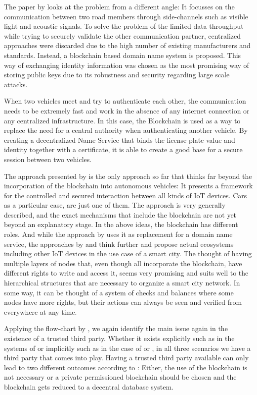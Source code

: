 The paper by \citeauthor{Rowan2017} looks at the problem from a different angle: It focusses on the communication between two road members through side-channels such as visible light and acoustic signals. To solve the problem of the limited data throughput while trying to securely validate the other communication partner, centralized approaches were discarded due to the high number of existing manufacturers and standards. Instead, a blockchain based domain name system is proposed. This way of exchanging identity information was chosen as the most promising way of storing public keys due to its robustness and security regarding large scale attacks.

When two vehicles meet and try to authenticate each other, the communication  needs to be extremely fast and work in the absence of any internet connection or any centralized infrastructure. 
In this case, the Blockchain is used as a way to replace the need for a central authority when authenticating another vehicle. By creating a decentralized Name Service that binds the license plate value and identity together with a certificate, it is able to create a good base for a secure session between two vehicles.


The approach presented by \citeauthor{Sharma2017} is the only approach so far that thinks far beyond the incorporation of the blockchain into autonomous vehicles: It presents a framework for the controlled and secured interaction between all kinds of IoT devices. Cars as a particular case, are just one of them. The approach is very generally described, and the exact mechanisms that include the blockchain are not yet beyond an explanatory stage.
In the above ideas, the blockchain has different roles. And while the approach by \cite{Rowan2017} uses it as replacement for a domain name service, the approaches by \cite{DorriSteger2017} and \cite{Sharma2017} think further and propose actual ecosystems including other IoT devices in the use case of a smart city.
The thought of having multiple layers of nodes that, even though all incorporate the blockchain, have different rights to write and access it, seems very promising and suits well to the hierarchical structures that are necessary to organize a smart city network. In some way, it can be thought of a system of checks and balances where some nodes have more rights, but their actions can always be seen and verified from everywhere at any time.

Applying the flow-chart by \citeauthor{Wust2017}, we again identify the main issue again in the existence of a trusted third party. Whether it exists explicitly such as in the systems of \cite{Sharma2017} or implicitly such as in the case of \cite{Rowan2017} or \cite{DorriSteger2017}, in all three scenarios we have a third party that comes into play. 
Having a trusted third party available can only lead to two different outcomes according to \citeauthor{Wust2017}: Either, the use of the blockchain is not necessary or a private permissioned blockchain should be chosen \cite{Wust2017} and the blockchain gets reduced to a decentral database system.

